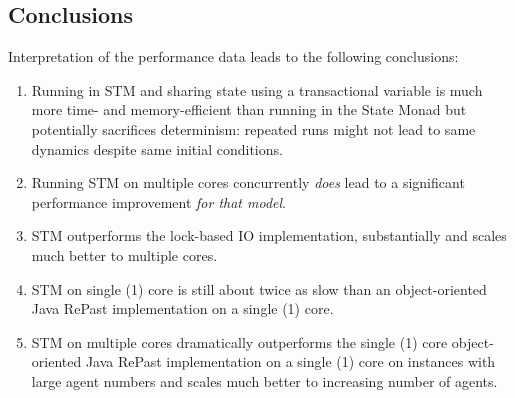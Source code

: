 
\subsection{Conclusions}
Interpretation of the performance data leads to the following conclusions:
\begin{enumerate}
	\item Running in STM and sharing state using a transactional variable is much more time- and memory-efficient than running in the State Monad but potentially sacrifices determinism: repeated runs might not lead to same dynamics despite same initial conditions.
	\item Running STM on multiple cores concurrently \textit{does} lead to a significant performance improvement \textit{for that model}.
	\item STM outperforms the lock-based IO implementation, substantially and scales much better to multiple cores.
	\item STM on single (1) core is still about twice as slow than an object-oriented Java RePast implementation on a single (1) core.
	\item STM on multiple cores dramatically outperforms the single (1) core object-oriented Java RePast implementation on a single (1) core on instances with large agent numbers and scales much better to increasing number of agents.
\end{enumerate}
